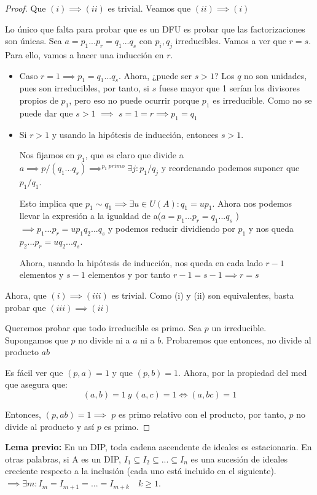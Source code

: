 \begin{proof}
	Que $(i)\implies (ii)$ es trivial. Veamos que $(ii) \implies (i)$

	Lo único que falta para probar que es un DFU es probar que las factorizaciones son únicas. Sea $a= p_1...p_r = q_1...q_s$ con $p_i,q_j$ irreducibles. Vamos a ver que $r=s$. Para ello, vamos a hacer una inducción en $r$.

	\begin{itemize}
	\item Caso $r=1 \implies p_1 = q_1...q_s$. Ahora, ¿puede ser $s>1$? Los $q$ no son unidades, pues son irreducibles, por tanto, si $s$ fuese mayor que 1 serían los divisores propios de $p_1$, pero eso no puede ocurrir porque $p_1$ es irreducible. Como no se puede dar que $s>1$ $\implies$ $s=1=r \implies p_1 = q_1$

	\item Si $r> 1$ y usando la hipótesis de inducción, entonces $s > 1$.

	Nos fijamos en $p_1$, que es claro que divide a $a\implies p/(q_1...q_s)\implies^{p_1 \ primo} \exists j : p_1 /q_j$ y reordenando podemos suponer que $p_1/q_1$.

	Esto implica que $p_1 \sim q_1 \implies \exists u \in U(A): q_1 = up_1$. Ahora nos podemos llevar la expresión a la igualdad de a($a= p_1...p_r = q_1...q_s$ ) $\implies p_1...p_r = up_1q_2...q_s $ y podemos reducir dividiendo por $p_1$ y nos queda $p_2...p_r = uq_2...q_s$.

	Ahora, usando la hipótesis de inducción, nos queda en cada lado $r-1$ elementos y $s-1$ elementos y por tanto $r-1 =s-1\implies r=s$
\end{itemize}

Ahora, que $(i) \implies (iii)$ es trivial. Como (i) y (ii) son equivalentes, basta probar que $(iii) \implies (ii)$

Queremos probar que todo irreducible es primo. Sea $p$ un irreducible. Supongamos que $p$ no divide ni a $a$ ni a $b$. Probaremos que entonces, no divide al producto $ab$

Es fácil ver que $(p,a) = 1$ y que $(p,b) = 1$. Ahora, por la propiedad del mcd que asegura que:
\[
(a,b) = 1 \ y \ (a,c) = 1 \iff (a,bc) = 1
\]

Entonces, $(p,ab) = 1 \implies$ $p$ es primo relativo con el producto, por tanto, $p$ no divide al producto y así $p$ es primo.
\end{proof}

	\textbf{Lema previo:} En un DIP, toda cadena ascendente de ideales es estacionaria. En otras palabras, si A es un DIP, $I_1 \subseteq I_2 \subseteq ... \subseteq I_{n}$ es una sucesión de ideales creciente respecto a la inclusión (cada uno está incluido en el siguiente). $\implies \exists m : I_m = I_{m+1} = ... = I_{m+k} \quad k \geq 1$.


